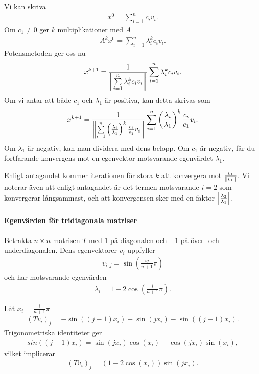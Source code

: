 \proof
Vi kan skriva
\begin{align*}
	x^{0} = \sum\limits_{i = 1}^{n}c_{i}v_{i}.
\end{align*}
Om $c_{1} \neq 0$ ger $k$ multiplikationer med $A$
\begin{align*}
	A^{k}x^{0} = \sum\limits_{i = 1}^{n}\lambda_{i}^{k}c_{i}v_{i}.
\end{align*}
Potensmetoden ger oss nu
\begin{align*}
	x^{k + 1} = \frac{1}{\norm{\sum\limits_{i = 1}^{n}\lambda_{i}^{k}c_{i}v_{i}}}\sum\limits_{i = 1}^{n}\lambda_{i}^{k}c_{i}v_{i}.
\end{align*}
Om vi antar att både $c_{1}$ och $\lambda_{1}$ är positiva, kan detta skrivas som
\begin{align*}
	x^{k + 1} = \frac{1}{\norm{\sum\limits_{i = 1}^{n}\left(\frac{\lambda_{i}}{\lambda_{1}}\right)^{k}\frac{c_{i}}{c_{1}}v_{i}}}\sum\limits_{i = 1}^{n}\left(\frac{\lambda_{i}}{\lambda_{1}}\right)^{k}\frac{c_{i}}{c_{1}}v_{i}.
\end{align*}
Om $\lambda_{1}$ är negativ, kan man dividera med dens belopp. Om $c_{1}$ är negativ, får du fortfarande konvergens mot en egenvektor motsvarande egenvärdet $\lambda_{1}$.

Enligt antagandet kommer iterationen för stora $k$ att konvergera mot $\frac{v_{1}}{\norm{v_{1}}}$. Vi noterar även att enligt antagandet är det termen motsvarande $i = 2$ som konvergerar långsammast, och att konvergensen sker med en faktor $\abs{\frac{\lambda_{2}}{\lambda_{1}}}$.

\paragraph{Egenvärden för tridiagonala matriser}
Betrakta $n\times n$-matrisen $T$ med $1$ på diagonalen och $-1$ på över- och underdiagonalen. Dens egenvektorer $v_{i}$ uppfyller
\begin{align*}
	v_{i, j} = \sin(\frac{ij}{n + 1}\pi)
\end{align*}
och har motsvarande egenvärden
\begin{align*}
	\lambda_{i} = 1 - 2\cos(\frac{i}{n + 1}\pi).
\end{align*}

\proof
Låt $x_{i} = \frac{i}{n + 1}\pi$
\begin{align*}
	(Tv_{i})_{j} = -\sin((j - 1)x_{i}) + \sin(jx_{i}) - \sin((j + 1)x_{i}).
\end{align*}
Trigonometriska identiteter ger
\begin{align*}
	sin((j \pm 1)x_{i}) = \sin(jx_{i})\cos(x_{i}) \pm \cos(jx_{i})\sin(x_{i}),
\end{align*}
vilket implicerar
\begin{align*}
	(Tv_{i})_{j} = (1 - 2\cos(x_{i}))\sin(jx_{i}).
\end{align*}

